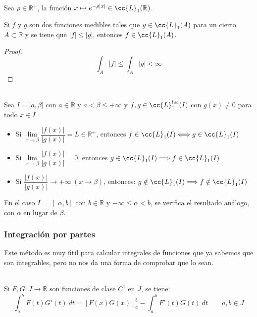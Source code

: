 \begin{ejercicio*}
    Sea $\rho \in \mathbb{R}^+$, la función $x\mapsto e^{-\rho|x|}\in \cc{L}_1(\mathbb{R})$.
\end{ejercicio*}

\begin{observacion}
    Si $f$ y $g$ son dos funciones medibles tales que $g\in \cc{L}_1(A)$ para un cierto $A\subset \mathbb{R}$ y se tiene que $|f|\leq |g|$, entonces $f\in \cc{L}_1(A)$.
    
\end{observacion}
\begin{proof}
    \begin{equation*}
        \int_A |f| \leq \int_A |g| < \infty
    \end{equation*}
\end{proof}


\begin{prop}\ \\
    Sea $I=[a, \beta[$ con $a\in \mathbb{R}$ y $a<\beta \leq +\infty$ y $f,g\in \cc{L}_1^{loc}(I)$ con $g(x)\neq 0$ para todo $x\in I$
    \begin{itemize}
        \item Si $\lim\limits_{x\to\beta}\dfrac{|f(x)|}{|g(x)|} = L \in \mathbb{R}^+ $, entonces $f\in \cc{L}_1(I) \Longleftrightarrow g\in \cc{L}_1(I)$
        \item Si $\lim\limits_{x\to\beta} \dfrac{|f(x)|}{|g(x)|} = 0 $, entonces $g\in \cc{L}_1(I)\Longrightarrow f\in \cc{L}_1(I)$
        \item Si $\dfrac{|f(x)|}{|g(x)|}\rightarrow +\infty \ (x\rightarrow\beta)$, entonces: $g\notin \cc{L}_1(I) \Longrightarrow f\notin\cc{L}_1(I)$
    \end{itemize}
    En el caso $I=\left]\alpha,b\right]$ con $b\in \mathbb{R}$ y $-\infty\leq \alpha < b$, se verifica el resultado análogo, con $\alpha$ en lugar de $\beta$.
\end{prop}

\subsubsection{Integración por partes}
Este método es muy útil para calcular integrales de funciones que ya sabemos que son integrables, pero no nos da una forma de comprobar que lo sean.
\begin{teo}\ \\
    Si $F,G:J\rightarrow\mathbb{R}$ son funciones de clase $C^1$ en $J$, se tiene:
    \begin{equation*}
        \displaystyle\int_{a}^{b} F(t)G'(t)~dt  = {[F(x)G(x)]}_a^b - \displaystyle\int_{a}^{b} F'(t)G(t)~dt  \qquad a,b\in J
    \end{equation*}
\end{teo}

